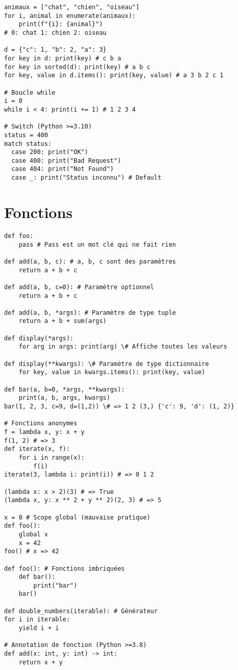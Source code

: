 \documentclass{article}
\begin{document}
\begin{multicols*}{4}
\begin{lstlisting}
animaux = ["chat", "chien", "oiseau"]
for i, animal in enumerate(animaux):
    print(f"{i}: {animal}")
# 0: chat 1: chien 2: oiseau

d = {"c": 1, "b": 2, "a": 3}
for key in d: print(key) # c b a
for key in sorted(d): print(key) # a b c
for key, value in d.items(): print(key, value) # a 3 b 2 c 1

# Boucle while
i = 0
while i < 4: print(i += 1) # 1 2 3 4
  
# Switch (Python >=3.10)
status = 400
match status:
  case 200: print("OK")
  case 400: print("Bad Request")  
  case 404: print("Not Found")
  case _: print("Status inconnu") # Default      
\end{lstlisting}

\section*{Fonctions}
\begin{lstlisting}
def foo: 
    pass # Pass est un mot clé qui ne fait rien

def add(a, b, c): # a, b, c sont des paramètres
    return a + b + c

def add(a, b, c=0): # Paramètre optionnel
    return a + b + c

def add(a, b, *args): # Paramètre de type tuple
    return a + b + sum(args)

def display(*args): 
    for arg in args: print(arg) \# Affiche toutes les valeurs

def display(**kwargs): \# Paramètre de type dictionnaire
    for key, value in kwargs.items(): print(key, value)

def bar(a, b=0, *args, **kwargs):
    print(a, b, args, kwargs) 
bar(1, 2, 3, c=9, d=(1,2)) \# => 1 2 (3,) {'c': 9, 'd': (1, 2)}

# Fonctions anonymes
f = lambda x, y: x + y
f(1, 2) # => 3
def iterate(x, f):
    for i in range(x):
        f(i)
iterate(3, lambda i: print(i)) # => 0 1 2

(lambda x: x > 2)(3) # => True
(lambda x, y: x ** 2 + y ** 2)(2, 3) # => 5

x = 0 # Scope global (mauvaise pratique)
def foo():
    global x
    x = 42
foo() # x => 42

def foo(): # Fonctions imbriquées
    def bar():
        print("bar")
    bar()

def double_numbers(iterable): # Générateur
for i in iterable:
    yield i + i

# Annotation de fonction (Python >=3.8)
def add(x: int, y: int) -> int:
    return x + y
\end{lstlisting}


\end{multicols*}
\end{document}

